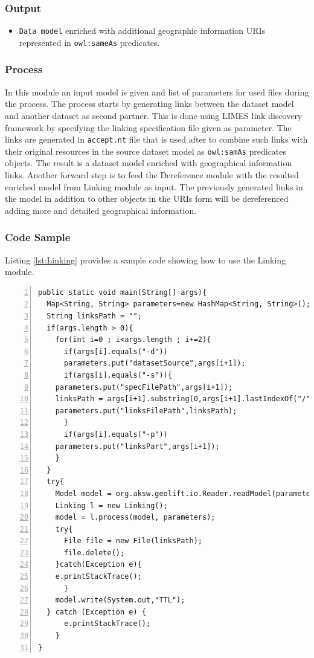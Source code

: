 \documentclass[a4paper,twoside,bibtotoc,abstracton,12pt,BCOR=15mm]{article}
\begin{document}
\subsubsection{Output}
\begin{itemize}
 \item \texttt{Data model} enriched with additional geographic information URIs represented in \texttt{owl:sameAs} predicates.
\end{itemize}

\subsubsection{Process}
In this module an input model is given and list of parameters for used files during the process. The process starts by generating links between the dataset model and another dataset as second partner. 
This is done using LIMES link discovery framework by specifying the linking specification file given as parameter.
The links are generated in \texttt{accept.nt} file that is used after to combine such links with their original resources in the source dataset model as \texttt{owl:samAs} predicates objects. The result is a dataset model enriched with geographical information links. 
Another forward step is to feed the Dereference module with the resulted enriched model from Linking module as input. 
The previously generated links in the model in addition to other objects in the URIs form will be dereferenced adding more and detailed geographical information.
\subsubsection{Code Sample}
Listing \ref{lst:Linking} provides a sample code showing how to use the Linking module.
\begingroup
    \fontsize{8pt}{10pt}\selectfont
\begin{lstlisting}[label=lst:Linking, numbers=left, numberstyle=\tiny, caption = Code fragment to call the \texttt{Linking} class.]
public static void main(String[] args){
  Map<String, String> parameters=new HashMap<String, String>();
  String linksPath = "";
  if(args.length > 0){
    for(int i=0 ; i<args.length ; i+=2){
      if(args[i].equals("-d"))
      parameters.put("datasetSource",args[i+1]);
      if(args[i].equals("-s")){
	parameters.put("specFilePath",args[i+1]);
	linksPath = args[i+1].substring(0,args[i+1].lastIndexOf("/"))+"/accept.nt";
	parameters.put("linksFilePath",linksPath);
      }
      if(args[i].equals("-p"))
	parameters.put("linksPart",args[i+1]);
    }
  }
  try{
    Model model = org.aksw.geolift.io.Reader.readModel(parameters.get("datasetSource"));
    Linking l = new Linking();
    model = l.process(model, parameters);
    try{
      File file = new File(linksPath);
      file.delete();
    }catch(Exception e){
	e.printStackTrace();
      }
    model.write(System.out,"TTL");
  } catch (Exception e) {
      e.printStackTrace();
    }
}
\end{lstlisting}
\endgroup
\end{document}
